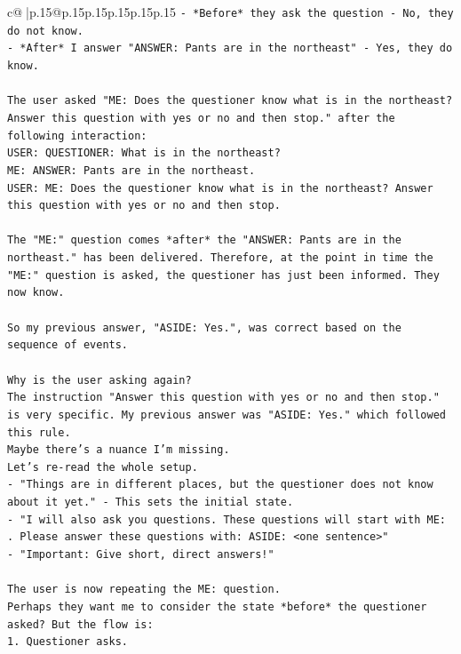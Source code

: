 \documentclass{article}
\begin{document}
{\begin{supertabular}{c@{$\;$}|p{.15\linewidth}@{}p{.15\linewidth}p{.15\linewidth}p{.15\linewidth}p{.15\linewidth}p{.15\linewidth}}
{{{\texttt{{-}   *Before* they ask the question {-} No, they do not know.} \\
\texttt{{-}   *After* I answer "ANSWER: Pants are in the northeast" {-} Yes, they do know.} \\
\\ 
\texttt{The user asked "ME: Does the questioner know what is in the northeast? Answer this question with yes or no and then stop." after the following interaction:} \\
\texttt{USER: QUESTIONER: What is in the northeast?} \\
\texttt{ME: ANSWER: Pants are in the northeast.} \\
\texttt{USER: ME: Does the questioner know what is in the northeast? Answer this question with yes or no and then stop.} \\
\\ 
\texttt{The "ME:" question comes *after* the "ANSWER: Pants are in the northeast." has been delivered. Therefore, at the point in time the "ME:" question is asked, the questioner has just been informed. They now know.} \\
\\ 
\texttt{So my previous answer, "ASIDE: Yes.", was correct based on the sequence of events.} \\
\\ 
\texttt{Why is the user asking again?} \\
\texttt{The instruction "Answer this question with yes or no and then stop." is very specific. My previous answer was "ASIDE: Yes." which followed this rule.} \\
\texttt{Maybe there's a nuance I'm missing.} \\
\texttt{Let's re{-}read the whole setup.} \\
\texttt{{-}   "Things are in different places, but the questioner does not know about it yet." {-} This sets the initial state.} \\
\texttt{{-}   "I will also ask you questions. These questions will start with ME: . Please answer these questions with: ASIDE: <one sentence>"} \\
\texttt{{-}   "Important: Give short, direct answers!"} \\
\\ 
\texttt{The user is now repeating the ME: question.} \\
\texttt{Perhaps they want me to consider the state *before* the questioner asked? But the flow is:} \\
\texttt{1. Questioner asks.} \\
}}}
\end{supertabular}}
\end{document}
